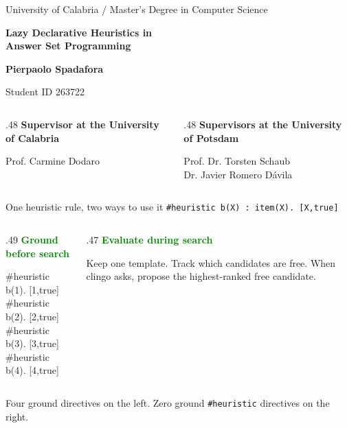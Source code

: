 \documentclass[aspectratio=169,11pt]{beamer}
\newcommand{\accented}[1]{\textcolor{green}{\textbf{#1}}}
\begin{document}
\begin{frame}[plain]
{\small University of Calabria \quad / \quad Master's Degree in Computer Science}\par
\vfill
{\huge\bfseries Lazy Declarative Heuristics in\\ Answer Set Programming\par}
\vfill
{\large\bfseries Pierpaolo Spadafora}\par
{\small Student ID 263722}\par\medskip
\begin{columns}[T,onlytextwidth]
\begin{column}{.48\textwidth}
{\small\bfseries Supervisor at the University of Calabria}\par
{\small Prof. Carmine Dodaro}
\end{column}
\begin{column}{.48\textwidth}
{\small\bfseries Supervisors at the University of Potsdam}\par
{\small Prof. Dr. Torsten Schaub\\Dr. Javier Romero Dávila}
\end{column}
\end{columns}
\end{frame}

\begin{frame}{One heuristic rule, two ways to use it}
\centering\texttt{\#heuristic b(X) : item(X). [X,true]}\par\bigskip
\begin{columns}[T,onlytextwidth]
\begin{column}{.49\textwidth}
\accented{Ground before search}\par\medskip
{\small\ttfamily
\#heuristic b(1). [1,true]\\
\#heuristic b(2). [2,true]\\
\#heuristic b(3). [3,true]\\
\#heuristic b(4). [4,true]}
\end{column}
\begin{column}{.47\textwidth}
\accented{Evaluate during search}\par\medskip
Keep one template. Track which candidates are free. When clingo asks, propose the highest-ranked free candidate.
\end{column}
\end{columns}\bigskip
Four ground directives on the left. Zero ground \texttt{\#heuristic} directives on the right.
\end{frame}
\end{document}
